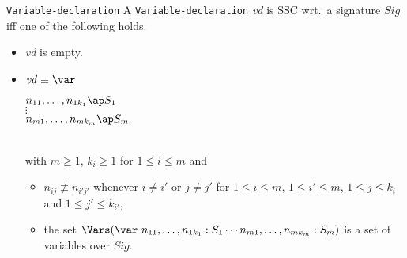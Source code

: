 \documentclass[twoside,fleqn,a4paper,dvips]{article}
\begin{document}
\begin{Dn-arg}{{\tt Variable-declaration}}
A {\tt Variable-declaration} {\it vd} is SSC wrt.\ a signature
$Sig$ iff one of the following holds.
\begin{itemize}
\item
{\it vd} is empty.
\item
${\it vd}\equiv\var$
\begin{minipage}[t]{7cm}
$n_{11},\ldots,n_{1k_1}\ap  S_1$\\
$\vdots$\\
$n_{m1},\ldots,n_{mk_m}\ap  S_m$\vspace{2ex}
\end{minipage}\\
with $m\geq 1$, $k_i\geq 1$ for $1\leq i\leq m$ and
\begin{itemize}
\item
$n_{ij}\not\equiv n_{i'j'}$ whenever $i\neq i'$ or 
$j\neq j'$ for $1\leq i\leq m$, $1\leq i'\leq m$,
$1\leq j\leq k_i$ and $1\leq j'\leq k_{i'}$,
\item
the set $\Vars(\var~n_{11},\ldots,n_{1k_1}: 
S_1\cdots n_{m1},\ldots,n_{mk_m}:
S_m)$ is a set of variables
over $Sig$.
\end{itemize}
\end{itemize}
\end{Dn-arg}
\end{document}

